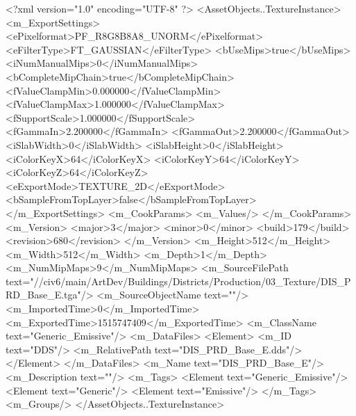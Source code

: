 <?xml version="1.0" encoding="UTF-8" ?>
<AssetObjects..TextureInstance>
	<m_ExportSettings>
		<ePixelformat>PF_R8G8B8A8_UNORM</ePixelformat>
		<eFilterType>FT_GAUSSIAN</eFilterType>
		<bUseMips>true</bUseMips>
		<iNumManualMips>0</iNumManualMips>
		<bCompleteMipChain>true</bCompleteMipChain>
		<fValueClampMin>0.000000</fValueClampMin>
		<fValueClampMax>1.000000</fValueClampMax>
		<fSupportScale>1.000000</fSupportScale>
		<fGammaIn>2.200000</fGammaIn>
		<fGammaOut>2.200000</fGammaOut>
		<iSlabWidth>0</iSlabWidth>
		<iSlabHeight>0</iSlabHeight>
		<iColorKeyX>64</iColorKeyX>
		<iColorKeyY>64</iColorKeyY>
		<iColorKeyZ>64</iColorKeyZ>
		<eExportMode>TEXTURE_2D</eExportMode>
		<bSampleFromTopLayer>false</bSampleFromTopLayer>
	</m_ExportSettings>
	<m_CookParams>
		<m_Values/>
	</m_CookParams>
	<m_Version>
		<major>3</major>
		<minor>0</minor>
		<build>179</build>
		<revision>680</revision>
	</m_Version>
	<m_Height>512</m_Height>
	<m_Width>512</m_Width>
	<m_Depth>1</m_Depth>
	<m_NumMipMaps>9</m_NumMipMaps>
	<m_SourceFilePath text="//civ6/main/ArtDev/Buildings/Districts/Production/03_Texture/DIS_PRD_Base_E.tga"/>
	<m_SourceObjectName text=""/>
	<m_ImportedTime>0</m_ImportedTime>
	<m_ExportedTime>1515747409</m_ExportedTime>
	<m_ClassName text="Generic_Emissive"/>
	<m_DataFiles>
		<Element>
			<m_ID text="DDS"/>
			<m_RelativePath text="DIS_PRD_Base_E.dds"/>
		</Element>
	</m_DataFiles>
	<m_Name text="DIS_PRD_Base_E"/>
	<m_Description text=""/>
	<m_Tags>
		<Element text="Generic_Emissive"/>
		<Element text="Generic"/>
		<Element text="Emissive"/>
	</m_Tags>
	<m_Groups/>
</AssetObjects..TextureInstance>

